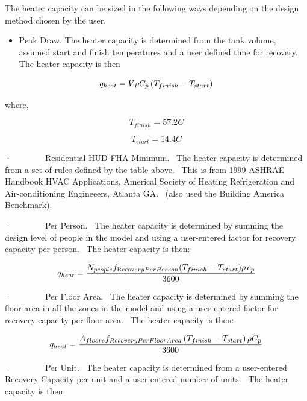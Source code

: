 The heater capacity can be sized in the following ways depending on the design method chosen by the user.

\begin{itemize}
  \item Peak Draw. The heater capacity is determined from the tank volume, assumed start and finish temperatures and a user defined time for recovery.~ The heater capacity is then
\end{itemize}

\begin{equation}
  q_{heat} = V\rho C_p \PB{T_{finish} - T_{start}}
\end{equation}

where,

\begin{equation}
{T_{finish}} = 57.2C
\end{equation}

\begin{equation}
{T_{start}} = 14.4C
\end{equation}

·~~~~~~~~Residential HUD-FHA Minimum.~ The heater capacity is determined from a set of rules defined by the table above.~ This is from 1999 ASHRAE Handbook HVAC Applications, Americal Society of Heating Refrigeration and Air-conditioning Engineeers, Atlanta GA.~ (also used the Building America Benchmark).

·~~~~~~~~Per Person.~ The heater capacity is determined by summing the design level of people in the model and using a user-entered factor for recovery capacity per person.~ The heater capacity is then:

\begin{equation}
{q_{heat}} = \frac{{{N_{people}}{f_{{\mathop{\rm Re}\nolimits} {\mathop{\rm cov}} eryPerPerson}}({T_{finish}} - {T_{start}})\rho \,{c_p}}}{{3600}}
\end{equation}

·~~~~~~~~Per Floor Area.~ The heater capacity is determined by summing the floor area in all the zones in the model and using a user-entered factor for recovery capacity per floor area.~ The heater capacity is then:

\begin{equation}
  q_{heat} = \frac{A_{floors}f_{RecoveryPerFloorArea}\PB{T_{finish} - T_{start}}\rho C_p}{3600}
\end{equation}

·~~~~~~~~Per Unit.~ The heater capacity is determined from a user-entered Recovery Capacity per unit and a user-entered number of units.~ The heater capacity is then:

